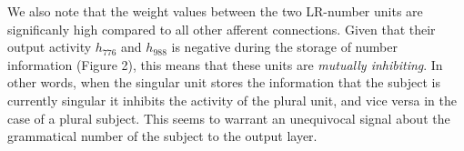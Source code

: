 We also note that the weight values between the two LR-number units are significanly high compared to all other afferent connections. Given that their output activity $h_776$ and $h_988$ is negative during the storage of number information (Figure 2), this means that these units are \textit{mutually inhibiting}. In other words, when the singular unit stores the information that the subject is currently singular it inhibits the activity of the plural unit, and vice versa in the case of a plural subject. This seems to warrant an unequivocal signal about the grammatical number of the subject to the output layer.
